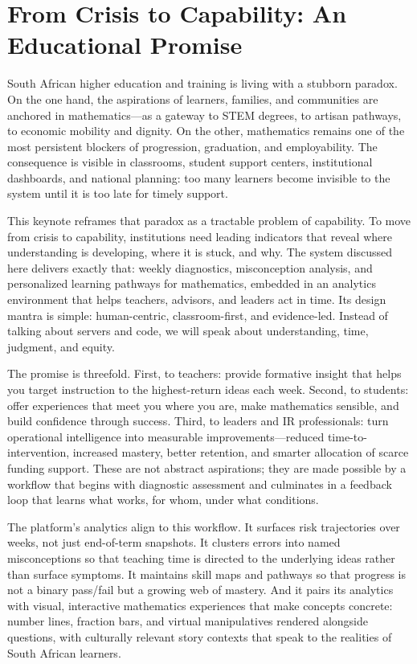 \section{From Crisis to Capability: An Educational Promise}

South African higher education and training is living with a stubborn paradox. On the one hand, the aspirations of learners, families, and communities are anchored in mathematics---as a gateway to STEM degrees, to artisan pathways, to economic mobility and dignity. On the other, mathematics remains one of the most persistent blockers of progression, graduation, and employability. The consequence is visible in classrooms, student support centers, institutional dashboards, and national planning: too many learners become invisible to the system until it is too late for timely support.

This keynote reframes that paradox as a tractable problem of capability. To move from crisis to capability, institutions need leading indicators that reveal where understanding is developing, where it is stuck, and why. The system discussed here delivers exactly that: weekly diagnostics, misconception analysis, and personalized learning pathways for mathematics, embedded in an analytics environment that helps teachers, advisors, and leaders act in time. Its design mantra is simple: human-centric, classroom-first, and evidence-led. Instead of talking about servers and code, we will speak about understanding, time, judgment, and equity.

The promise is threefold. First, to teachers: provide formative insight that helps you target instruction to the highest-return ideas each week. Second, to students: offer experiences that meet you where you are, make mathematics sensible, and build confidence through success. Third, to leaders and IR professionals: turn operational intelligence into measurable improvements---reduced time-to-intervention, increased mastery, better retention, and smarter allocation of scarce funding support. These are not abstract aspirations; they are made possible by a workflow that begins with diagnostic assessment and culminates in a feedback loop that learns what works, for whom, under what conditions.

The platform’s analytics align to this workflow. It surfaces risk trajectories over weeks, not just end-of-term snapshots. It clusters errors into named misconceptions so that teaching time is directed to the underlying ideas rather than surface symptoms. It maintains skill maps and pathways so that progress is not a binary pass/fail but a growing web of mastery. And it pairs its analytics with visual, interactive mathematics experiences that make concepts concrete: number lines, fraction bars, and virtual manipulatives rendered alongside questions, with culturally relevant story contexts that speak to the realities of South African learners.

